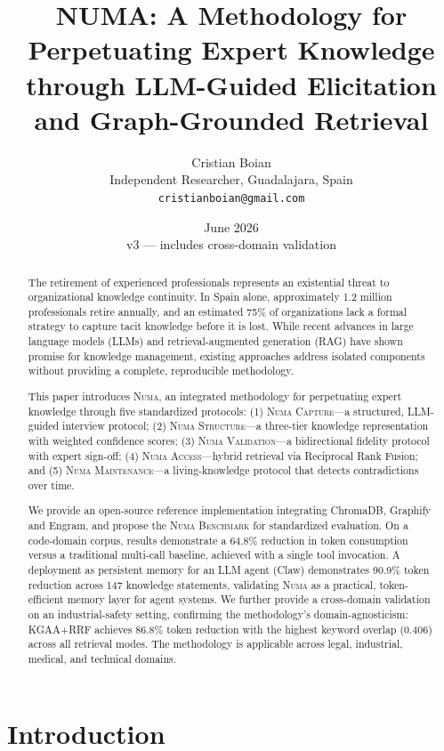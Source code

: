 \documentclass[11pt,a4paper]{article}
\title{\textbf{NUMA: A Methodology for Perpetuating Expert Knowledge}\\[4pt]
       \large through LLM-Guided Elicitation and Graph-Grounded Retrieval}
\author{Cristian Boian\\
        \small Independent Researcher, Guadalajara, Spain\\
        \small \texttt{cristianboian@gmail.com}}
\date{June 2026\\\small v3 --- includes cross-domain validation}
\begin{document}
\maketitle

\begin{abstract}
The retirement of experienced professionals represents an existential threat to organizational knowledge continuity. In Spain alone, approximately 1.2 million professionals retire annually, and an estimated 75\% of organizations lack a formal strategy to capture tacit knowledge before it is lost. While recent advances in large language models (LLMs) and retrieval-augmented generation (RAG) have shown promise for knowledge management, existing approaches address isolated components without providing a complete, reproducible methodology.

This paper introduces \textsc{Numa}, an integrated methodology for perpetuating expert knowledge through five standardized protocols: (1) \textsc{Numa Capture}---a structured, LLM-guided interview protocol; (2) \textsc{Numa Structure}---a three-tier knowledge representation with weighted confidence scores; (3) \textsc{Numa Validation}---a bidirectional fidelity protocol with expert sign-off; (4) \textsc{Numa Access}---hybrid retrieval via Reciprocal Rank Fusion; and (5) \textsc{Numa Maintenance}---a living-knowledge protocol that detects contradictions over time.

We provide an open-source reference implementation integrating ChromaDB, Graphify and Engram, and propose the \textsc{Numa Benchmark} for standardized evaluation. On a code-domain corpus, results demonstrate a 64.8\% reduction in token consumption versus a traditional multi-call baseline, achieved with a single tool invocation. A deployment as persistent memory for an LLM agent (Claw) demonstrates 90.9\% token reduction across 147 knowledge statements, validating \textsc{Numa} as a practical, token-efficient memory layer for agent systems. We further provide a cross-domain validation on an industrial-safety setting, confirming the methodology's domain-agnosticism: KGAA+RRF achieves 86.8\% token reduction with the highest keyword overlap (0.406) across all retrieval modes. The methodology is applicable across legal, industrial, medical, and technical domains.
\end{abstract}

\section{Introduction}
\end{document}
